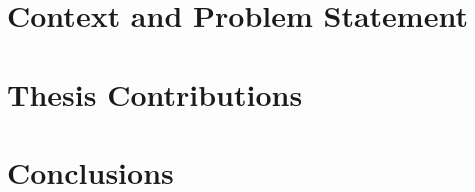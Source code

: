 \documentclass[english]{spimubphdthesis}
\begin{document}
 
\frontmatter




	
\setcounter{tocdepth}{2}
\tableofcontents

\mainmatter

\fontsize{12}{15}
\selectfont
 
\part{Context and Problem Statement}\label{part:context}




\part{Thesis Contributions}\label{part:techical}






\part{Conclusions}\label{part:conclusion}
\end{document}
